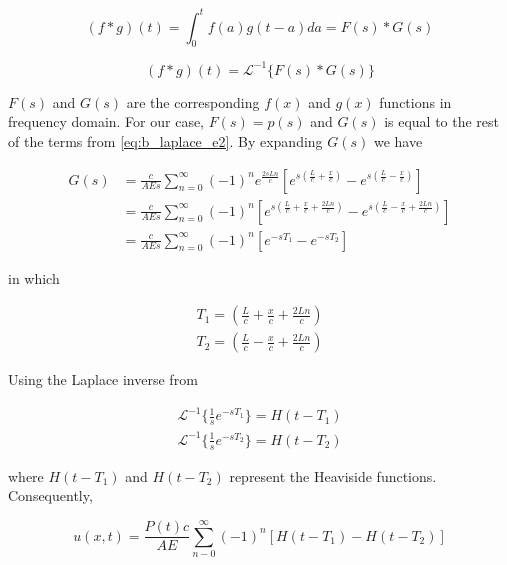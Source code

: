 \documentclass{article}
\begin{document}
\begin{equation}
    (f * g)(t) = \int_{0}^{t} f(a) g(t-a) da = F(s) * G(s)
    \label{eq:convolution}
\end{equation}

\begin{equation}
    (f * g)(t) = \mathcal{L}^{-1}\{ F(s) * G(s) \} 
    \label{eq:convolution_theorem}
\end{equation}

$F(s)$ and $G(s)$ are the corresponding $f(x)$ and $g(x)$ functions in frequency domain. For our case, $F(s) = p(s)$ and $G(s)$ is equal to the rest of the terms from \cref{eq:b_laplace_e2}. By expanding $G(s)$ we have

\begin{equation}
\begin{aligned}
    G(s)& = \frac{c}{AE s} \sum_{n = 0}^{\infty} (-1)^n e^{\frac{2sLn}{c}} \left [ e^{s(\frac{L}{c} + \frac{x}{c})} - e^{s(\frac{L}{c} - \frac{x}{c})} \right] \\
    & = \frac{c}{AE s} \sum_{n = 0}^{\infty} (-1)^n \left [ e^{s(\frac{L}{c} + \frac{x}{c} + \frac{2Ln}{c})} - e^{s(\frac{L}{c} - \frac{x}{c} + \frac{2Ln}{c})} \right] \\
    & = \frac{c}{AE s} \sum_{n = 0}^{\infty} (-1)^n \left [ e^{-sT_1} - e^{-sT_2} \right]
\end{aligned}
\end{equation}

in which 

\begin{align*}
    T_1 = \left( \frac{L}{c} + \frac{x}{c} + \frac{2Ln}{c} \right) \\
    T_2 = \left( \frac{L}{c} - \frac{x}{c} + \frac{2Ln}{c} \right)
\end{align*}

Using the Laplace inverse from \cite{Dyke2001} 

\begin{align*}
    \mathcal{L}^{-1}\{ \frac{1}{s} e^{-sT_1} \} = H(t-T_1) \\
    \mathcal{L}^{-1}\{ \frac{1}{s} e^{-sT_2} \} = H(t-T_2) 
\end{align*}

where $H(t-T_1)$ and $H(t-T_2)$ represent the Heaviside functions. Consequently, 

\begin{equation}
    u(x, t) = \frac{P(t) c}{AE} \sum_{n - 0}^{\infty} (-1)^n [H(t-T_1) - H(t-T_2)]
    \label{eq:b_response}
\end{equation}
\end{document}
